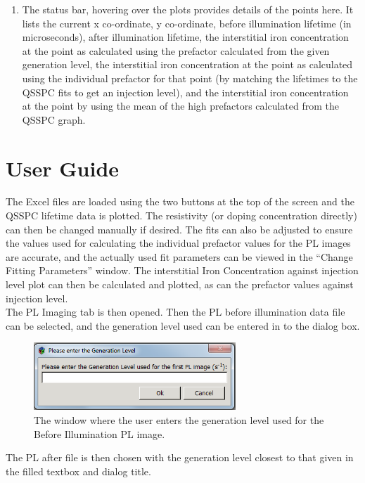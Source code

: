 \documentclass[final,a4paper,oneside,12pt]{article}
\begin{document}
\begin{enumerate}
\item The status bar, hovering over the plots provides details of the points here. It lists the current x co-ordinate, y co-ordinate, before illumination lifetime (in microseconds), after illumination lifetime, the interstitial iron concentration at the point as calculated using the prefactor calculated from the given generation level, the interstitial iron concentration at the point as calculated using the individual prefactor for that point (by matching the lifetimes to the QSSPC fits to get an injection level), and the interstitial iron concentration at the point by using the mean of the high prefactors calculated from the QSSPC graph.
\end{enumerate}


\section{User Guide}
The Excel files are loaded using the two buttons at the top of the screen and the QSSPC lifetime data is plotted. The resistivity (or doping concentration directly) can then be changed manually if desired. The fits can also be adjusted to ensure the values used for calculating the individual prefactor values for the PL images are accurate, and the actually used fit parameters can be viewed in the ``Change Fitting Parameters'' window. The interstitial Iron Concentration against injection level plot can then be calculated and plotted, as can the prefactor values against injection level.
\\
The PL Imaging tab is then opened. Then the PL before illumination data file can be selected, and the generation level used can be entered in to the dialog box.

\begin{figure}[h!]
\includegraphics[height=1in]{2genlevel}
\caption{\label{figure2} The window where the user enters the generation level used for the Before Illumination PL image.}
\end{figure}

The PL after file is then chosen with the generation level closest to that given in the filled textbox and dialog title.
\end{document}
